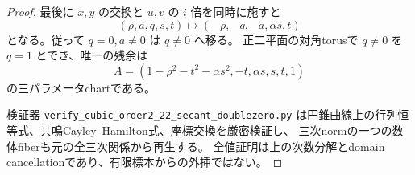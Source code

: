 \begin{proof}
最後に $x,y$ の交換と $u,v$ の $i$ 倍を同時に施すと
\[
 (\rho,a,q,s,t)\longmapsto(-\rho,-q,-a,\alpha s,t)
\]
となる。従って $q=0,a\ne0$ は $q\ne0$ へ移る。
正二平面の対角torusで $q\ne0$ を $q=1$ とでき、唯一の残余は
\[
 A=(1-\rho^2-t^2-\alpha s^2,-t,\alpha s,s,t,1)
\]
の三パラメータchartである。

検証器
\texttt{verify\_cubic\_order2\_22\_secant\_doublezero.py}
は円錐曲線上の行列恒等式、共鳴Cayley--Hamilton式、座標交換を厳密検証し、
三次normの一つの数体fiberも元の全三次関係から再生する。
全値証明は上の次数分解とdomain cancellationであり、有限標本からの外挿ではない。
\end{proof}
